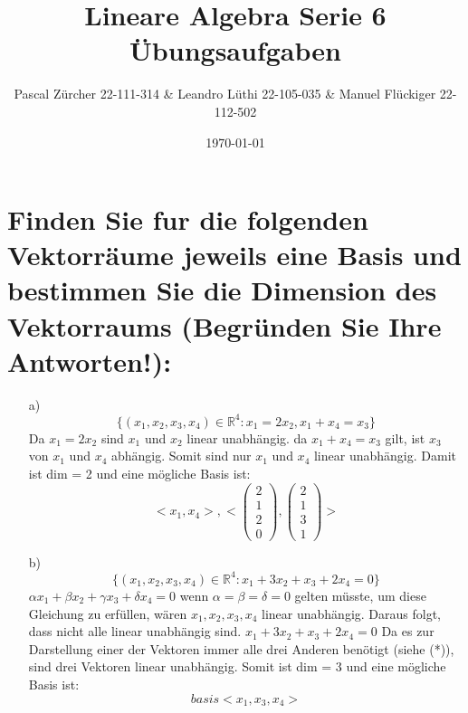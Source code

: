 \documentclass{article}
\author{
Pascal Zürcher 22-111-314 & 
Leandro Lüthi 22-105-035 & 
Manuel Flückiger 22-112-502}
\title{Lineare Algebra Serie 6 Übungsaufgaben}
\date{\today}
\begin{document}
\maketitle
\section{Finden Sie fur die folgenden Vektorräume jeweils eine Basis und
bestimmen Sie die Dimension des Vektorraums (Begründen Sie Ihre Antworten!):}
    \begin{enumerate}

        \item[a)] \[\{(x_1, x_2, x_3, x_4) ∈ \mathbb{R}^4   : x_1 = 2x_2, x_1 + x_4 = x_3\}\]
        Da $x_1 = 2x_2$ sind $x_1$ und $x_2$ linear 
        unabhängig. da $x_1 + x_4 = x_3$ gilt, ist $x_3$ von $x_1$ und $x_4$ 
        abhängig. Somit sind nur $x_1$ und $x_4$ linear unabhängig.
        Damit ist dim = 2 und eine mögliche Basis ist:
        \[<x_1, x_4> ,
        <\left(\begin{array}{c}2\\1\\2\\0\end{array}\right),
        \left(\begin{array}{c}2\\1\\3\\1\end{array}\right)>\]

        \item[b)]\[\{(x_1, x_2, x_3, x_4) ∈ \mathbb{R}^4   : x_1+3x_2+x_3+2x_4=0\}\]
        \newline
        $\alpha x_1 + \beta x_2 + \gamma x_3 + \delta x_4 = 0$ wenn $\alpha = \beta=\delta=0$
        gelten müsste, um diese Gleichung zu erfüllen, wären $x_1,x_2,x_3,x_4$ linear unabhängig.
        Daraus folgt, dass nicht alle linear unabhängig sind. $x_1+3x_2+x_3+2x_4 = 0$ Da es zur 
        Darstellung einer der Vektoren immer alle drei Anderen benötigt (siehe (*)), sind 
        drei Vektoren linear unabhängig. Somit ist dim = 3 und eine mögliche Basis 
        ist: 
        \[basis <x_1,x_3,x_4>\]


\end{enumerate}
\end{document}

